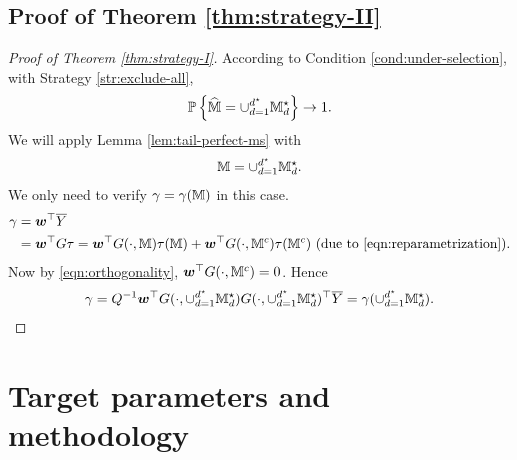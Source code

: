 \documentclass[12pt]{article}
\begin{document}
\subsection{Proof of Theorem \ref{thm:strategy-II}}
{
\begin{proof}[Proof of Theorem \ref{thm:strategy-I}]
According to Condition \ref{cond:under-selection}, with Strategy \ref{str:exclude-all}, 
\begin{align*}
    {{\mathbb{P}}\left\{\widehat{{\mathbb{M}}} = \cup_{d=1}^{d^\star}{\mathbb{M}}^\star_d\right\}} \to 1. 
\end{align*}
We will apply Lemma \ref{lem:tail-perfect-ms} with 
\begin{align*}
{\mathbb{M}} = \cup_{d=1}^{d^\star}{\mathbb{M}}_d^\star.
\end{align*}
We only need to verify $\gamma = \gamma({\mathbb{M}})$ in this case.
\begin{align*}
    \gamma &= {\boldsymbol{w}}^\top \overline{Y}\\
    &= {\boldsymbol{w}}^\top G\tau ={\boldsymbol{w}}^\top G(\cdot, {\mathbb{M}})\tau({\mathbb{M}}) + {\boldsymbol{w}}^\top G(\cdot, {\mathbb{M}}^c)\tau({\mathbb{M}}^c) \text{ (due to \eqref{eqn:reparametrization})}.
\end{align*}
Now by \eqref{eqn:orthogonality}, ${\boldsymbol{w}}^\top G(\cdot, {\mathbb{M}}^c) = 0$. Hence
\begin{align*}
    \gamma = Q^{-1}{\boldsymbol{w}}^\top G(\cdot, \cup_{d=1}^{d^\star}{\mathbb{M}}_d^\star)G(\cdot,\cup_{d=1}^{d^\star}{\mathbb{M}}_d^\star)^\top \overline{Y} = \gamma(\cup_{d=1}^{d^\star}{\mathbb{M}}_d^\star).
\end{align*}
\end{proof}
}

\section{Target parameters and methodology}
\end{document}
